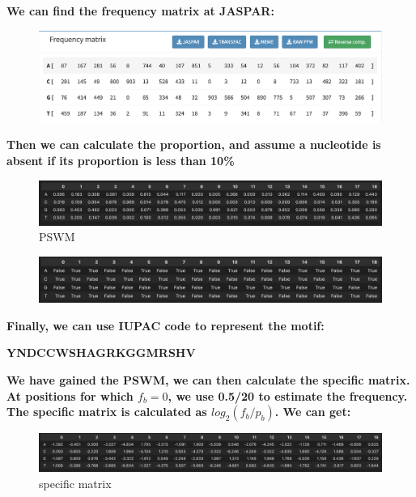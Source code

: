 \documentclass{article}
\begin{document}
\textbf{We can find the frequency matrix at JASPAR:}

\begin{figure}[h]
    \centering
    \includegraphics[width=1\textwidth]{jasparfreqmatrix.png}  %
\end{figure}

\textbf{Then we can calculate the proportion, and assume a nucleotide is absent if its 
proportion is less than 10\%}

\begin{figure}[H]
    \centering
    
    \includegraphics[width=1\textwidth]{pythonfreq1.png}  %
    \caption{PSWM}
\end{figure}

\begin{figure}[H]
    \centering
    \includegraphics[width=1\textwidth]{pythonfreq2.png}  %
\end{figure}

\textbf{Finally, we can use IUPAC code to represent the motif: 
}

\textbf{YNDCCWSHAGRKGGMRSHV
}

\textbf{We have gained the PSWM, we can then calculate the specific matrix. At positions
for which $ f_b = 0 $, we use 0.5/20 to estimate the frequency. The specific matrix is 
calculated as $log_2(f_b / p_b)$. We can get:}


\begin{figure}[H]
    \centering
    
    \includegraphics[width=1\textwidth]{specificmatrix.png}  %
    \caption{specific matrix}
\end{figure}
\end{document}
